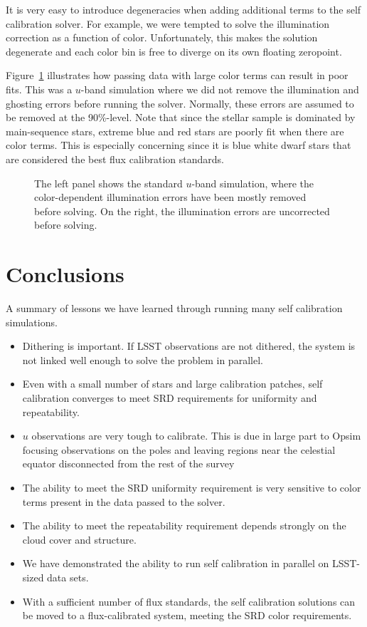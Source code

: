 \documentclass[12pt,preprint]{aastex}
\begin{document}
It is very easy to introduce degeneracies when adding additional terms to the self calibration solver.  For example, we were tempted to solve the illumination correction as a function of color.  Unfortunately, this makes the solution degenerate and each color bin is free to diverge on its own floating zeropoint.  

Figure~\ref{fig:badcolor} illustrates how passing data with large color terms can result in poor fits.  This was a $u$-band simulation where we did not remove the illumination and ghosting errors before running the solver.  Normally, these errors are assumed to be removed at the 90\%-level.  Note that since the stellar sample is dominated by main-sequence stars, extreme blue and red stars are poorly fit when there are color terms.  This is especially concerning since it is blue white dwarf stars that are considered the best flux calibration standards.

\begin{figure}
\caption{The left panel shows the standard $u$-band simulation, where the color-dependent illumination errors have been mostly removed before solving.  On the right,  the illumination errors are uncorrected before solving.  \label{fig:badcolor}}
\end{figure}


\section{Conclusions}
A summary of lessons we have learned through running many self calibration simulations.
\begin{itemize}
\item{Dithering is important.  If LSST observations are not dithered, the system is not linked well enough to solve the problem in parallel.}
\item{Even with a small number of stars and large calibration patches, self calibration converges to meet SRD requirements for uniformity and repeatability.}
\item{$u$ observations are very tough to calibrate.  This is due in large part to Opsim focusing observations on the poles and leaving regions near the celestial equator disconnected from the rest of the survey}
\item{The ability to meet the SRD uniformity requirement is very sensitive to color terms present in the data passed to the solver.}
\item{The ability to meet the repeatability requirement depends strongly on the cloud cover and structure.  }
\item{We have demonstrated the ability to run self calibration in parallel on LSST-sized data sets.}
\item{With a sufficient number of flux standards, the self calibration solutions can be moved to a flux-calibrated system, meeting the SRD color requirements.}
\end{itemize}
\end{document}
